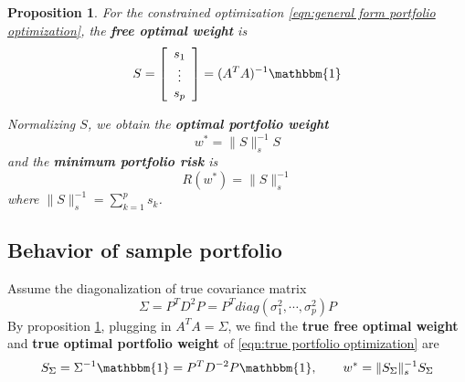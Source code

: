 \documentclass[12pt]{extarticle}
\newtheorem{proposition}[other]{Proposition}
\newcommand{\1}{\mathbbm{1}}
\newcommand{\mat}[2][rrrrrrrrrrrrrrrrrrrrrrrrrrrrrrrr]{\left[ \begin{array}{#1} #2 \\ \end{array}\right]}
\numberwithin{equation}{section}
\begin{document}
\begin{proposition}\label{prop:optimal formulas}
For the constrained optimization \ref{eqn:general form portfolio optimization}, the \textbf{free optimal weight}  is 
\begin{equation}\label{eqn:free optimal weight}
   S= \mat[c]{s_1\\\vdots \\ s_p} = (A^TA)^{-1}\1 
\end{equation}

Normalizing $S$, we obtain the \textbf{optimal portfolio weight} 
\begin{equation}\label{eqn:optimal weight}
    w^* = \|S\|_s^{-1} S
\end{equation}
and the \textbf{minimum portfolio risk} is 
\begin{equation}\label{eqn:optimal risk}
    R(w^*) =  \|S\|_s^{-1}
\end{equation}
where $\|S\|_s^{-1} = \sum_{k=1}^p s_k$.
\end{proposition}




\subsection{Behavior of sample portfolio}
Assume the diagonalization of true covariance matrix
\[
\Sigma =P^T D^2P =P^T diag (\sigma_1^2, \cdots, \sigma_p^2)P
\]
By proposition \ref{prop:optimal formulas}, plugging in $A^TA = \Sigma$, we find the \textbf{true free optimal weight} and \textbf{true optimal portfolio weight} of \ref{eqn:true portfolio optimization} are
\begin{equation}\label{eqn:true weight formula}
    S_{\Sigma} = \Sigma^{-1}\1 = P^T D^{-2}P \1 , \qquad w^* = \|S_{\Sigma} \|_s^{-1} S_{\Sigma}
\end{equation}
\end{document}
